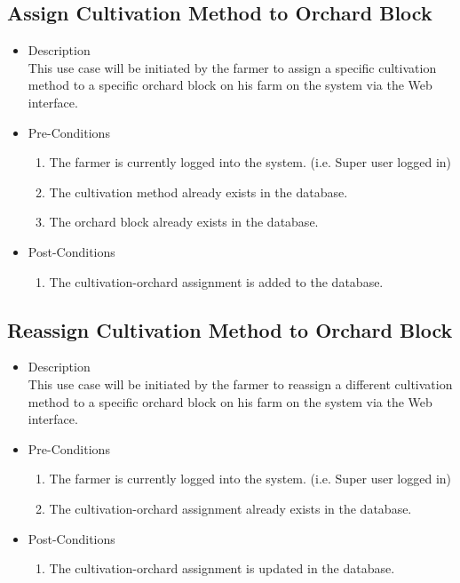 \documentclass[11pt,fleqn]{book} %
\begin{document}
		\subsection{Assign Cultivation Method to Orchard Block}
		\begin{itemize}
			\item Description\\
			This use case will be initiated by the farmer to assign a specific cultivation method to a specific orchard block on his farm on the system via the Web interface.
			\item Pre-Conditions
			\begin{enumerate}
				\item The farmer is currently logged into the system. (i.e. Super user logged in)
				\item The cultivation method already exists in the database. 
				\item The orchard block already exists in the database. 									
			\end{enumerate}
			\item Post-Conditions
			\begin{enumerate}
				\item The cultivation-orchard assignment is added to the database.
			\end{enumerate}
		\end{itemize}
		
		\subsection{Reassign Cultivation Method to Orchard Block}
		\begin{itemize}
			\item Description\\
			This use case will be initiated by the farmer to reassign a different cultivation method to a specific orchard block on his farm on the system via the Web interface.
			\item Pre-Conditions
			\begin{enumerate}
				\item The farmer is currently logged into the system. (i.e. Super user logged in)
				\item The cultivation-orchard assignment already exists in the database.				
			\end{enumerate}
			\item Post-Conditions
			\begin{enumerate}
				\item The cultivation-orchard assignment is updated in the database.
			\end{enumerate}
		\end{itemize}
		
\end{document}

